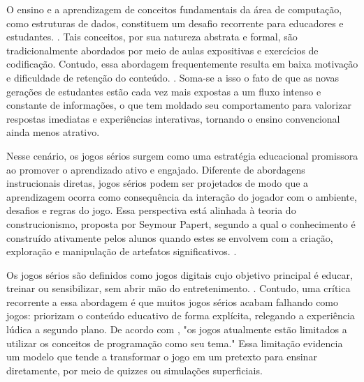 O ensino e a aprendizagem de conceitos fundamentais da área de computação, como estruturas de dados, constituem um desafio recorrente para educadores e estudantes. . Tais conceitos, por sua natureza abstrata e formal, são tradicionalmente abordados por meio de aulas expositivas e exercícios de codificação. Contudo, essa abordagem frequentemente resulta em baixa motivação e dificuldade de retenção do conteúdo. . Soma-se a isso o fato de que as novas gerações de estudantes estão cada vez mais expostas a um fluxo intenso e constante de informações, o que tem moldado seu comportamento para valorizar respostas imediatas e experiências interativas, tornando o ensino convencional ainda menos atrativo.

Nesse cenário, os jogos sérios surgem como uma estratégia educacional promissora ao promover o aprendizado ativo e engajado. Diferente de abordagens instrucionais diretas, jogos sérios podem ser projetados de modo que a aprendizagem ocorra como consequência da interação do jogador com o ambiente, desafios e regras do jogo. Essa perspectiva está alinhada à teoria do construcionismo, proposta por Seymour Papert, segundo a qual o conhecimento é construído ativamente pelos alunos quando estes se envolvem com a criação, exploração e manipulação de artefatos significativos. .

Os jogos sérios são definidos como jogos digitais cujo objetivo principal é educar, treinar ou sensibilizar, sem abrir mão do entretenimento. . Contudo, uma crítica recorrente a essa abordagem é que muitos jogos sérios acabam falhando como jogos: priorizam o conteúdo educativo de forma explícita, relegando a experiência lúdica a segundo plano. De acordo com \cite{de2025codebo}, "os jogos atualmente estão limitados a utilizar os conceitos de programação como seu tema." Essa limitação evidencia um modelo que tende a transformar o jogo em um pretexto para ensinar diretamente, por meio de quizzes ou simulações superficiais.

